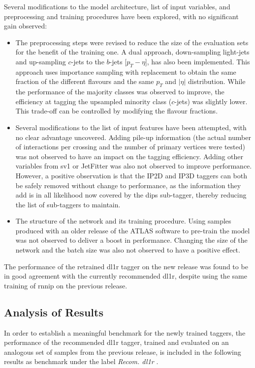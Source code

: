 Several modifications to the model architecture, list of input variables, and preprocessing and training procedures have been explored, with no significant gain observed:
\begin{itemize}
\item The preprocessing steps were revised to reduce the size of the evaluation sets for the benefit of the training one. A dual approach, down-sampling light-jets and up-sampling $c$-jets to the $b$-jets [$p_T - \eta$], has also been implemented. This approach uses importance sampling with replacement to obtain the same fraction of the different flavours and the same $p_T$ and $|\eta|$ distribution. While the performance of the majority classes was observed to improve, the efficiency at tagging the upsampled minority class ($c$-jets) was slightly lower. This trade-off can be controlled by modifying the flavour fractions. 
\item Several modifications to the list of input features have been attempted, with no clear advantage uncovered. Adding pile-up information (the actual number of interactions per crossing and the number of primary vertices were tested) was not observed to have an impact on the tagging efficiency. Adding other variables from \gls{sv1} or JetFitter was also not observed to improve performance. However, a positive observation is that the IP2D and IP3D taggers can both be safely removed without change to performance, as the information they add is in all likelihood now covered by the \gls{dips} sub-tagger, thereby reducing the list of sub-taggers to maintain.
\item The structure of the network and its training procedure. Using samples produced with an older release of the ATLAS software to pre-train the model was not observed to deliver a boost in performance. Changing the size of the network and the batch size was also not observed to have a positive effect.
\end{itemize}

The performance of the retrained \gls{dl1r} tagger on the new release was found to be in good agreement with the currently recommended \gls{dl1r}, despite using the same training of \gls{rnnip} on the previous release.  

\subsection{Analysis of Results}
In order to establish a meaningful benchmark for the newly trained taggers, the performance of the recommended \gls{dl1r} tagger, trained and evaluated on an analogous set of samples from the previous release, is included in the following results as benchmark under the label \textit{Recom. \gls{dl1r} }. \\

